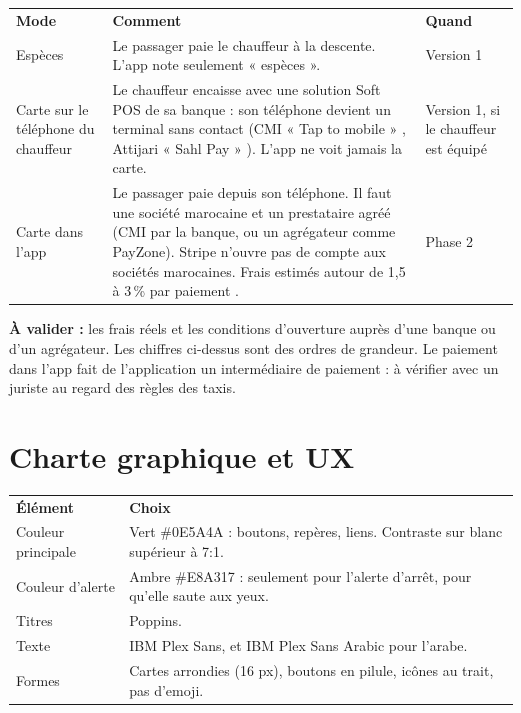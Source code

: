 \documentclass[11pt,a4paper]{article}
\newcommand{\hd}[1]{\textbf{\color{white}#1}}
\newcommand{\hdrow}{\rowcolor{brand}}
\newcommand{\valider}[1]{\begin{avalider}\textbf{À valider :} #1\end{avalider}}
\begin{document}
\begin{xltabular}{\textwidth}{@{}P{3cm} Y P{2.3cm}@{}}
\hdrow \hd{Mode} & \hd{Comment} & \hd{Quand} \\
Espèces & Le passager paie le chauffeur à la descente. L'app note seulement « espèces ». & Version 1 \\
Carte sur le téléphone du chauffeur & Le chauffeur encaisse avec une solution Soft POS de sa banque : son téléphone devient un terminal sans contact (CMI « Tap to mobile » \cite{cmi}, Attijari « Sahl Pay » \cite{sahl}). L'app ne voit jamais la carte. & Version 1, si le chauffeur est équipé \\
Carte dans l'app & Le passager paie depuis son téléphone. Il faut une société marocaine et un prestataire agréé (CMI par la banque, ou un agrégateur comme PayZone). Stripe n'ouvre pas de compte aux sociétés marocaines. Frais estimés autour de 1,5 à 3\,\% par paiement \cite{kolonell}. & Phase 2 \\
\end{xltabular}

\valider{les frais réels et les conditions d'ouverture auprès d'une banque ou d'un agrégateur. Les chiffres ci-dessus sont des ordres de grandeur. Le paiement dans l'app fait de l'application un intermédiaire de paiement : à vérifier avec un juriste au regard des règles des taxis.}

\Needspace{8cm}
\section{Charte graphique et UX}

\begin{center}
\end{center}

\begin{xltabular}{\textwidth}{@{}l Y@{}}
\hdrow \hd{Élément} & \hd{Choix} \\
Couleur principale & Vert \#0E5A4A : boutons, repères, liens. Contraste sur blanc supérieur à 7:1. \\
Couleur d'alerte & Ambre \#E8A317 : seulement pour l'alerte d'arrêt, pour qu'elle saute aux yeux. \\
Titres & Poppins. \\
Texte & IBM Plex Sans, et IBM Plex Sans Arabic pour l'arabe. \\
Formes & Cartes arrondies (16 px), boutons en pilule, icônes au trait, pas d'emoji. \\
\end{xltabular}
\end{document}
